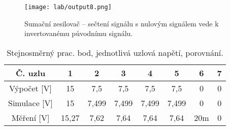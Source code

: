 \begin{figure}[h!]
    \centering
    \texttt{[image: lab/output8.png]}
    \caption{Sumační zesilovač -- sečtení signálu s nulovým signálem vede k invertovanému původnímu signálu.}
    \label{fig:lab-output8-png}
\end{figure}



\begin{table}[h!]
    \centering
    \def\arraystretch{1.4}
    \caption{Stejnosměrný prac. bod, jednotlivá uzlová napětí, porovnání.}
    \begin{tabular}{|c|c|c|c|c|c|c|c|}
        \hline
            Č. uzlu & 1 & 2 & 3 & 4 & 5 &  6 &  7 \\
        \hline
            Výpočet [V] & 15 & 7,5 & 7,5 & 7,5 & 7,5 &  0 &  0 \\
            Simulace [V] & 15 & 7,499 & 7,499 & 7,499 & 7,499 &  0 &  0 \\
            Měření [V] & 15,27 & 7,62 & 7,64 & 7,64 & 7,64 &  20m &  0 \\
        \hline
    \end{tabular}
    \label{tab:dc-bod}
\end{table}